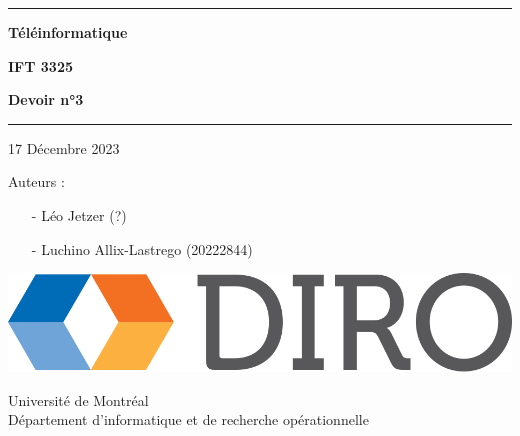 \documentclass{article}
\begin{document}
\begin{titlepage}

	\begin{center}
		\hrule

		\vspace{.5cm}

		\Huge
		\textbf{Téléinformatique}

		\vspace{.3cm}
		\LARGE

		\textbf{IFT 3325}
		\vspace{.3cm}

		\textbf{Devoir n°3}
		\vspace{.3cm}

		\hrule

		\vspace{1cm}

		17 Décembre 2023 \\
	\end{center}

	\vspace{2cm}

	\LARGE

	\noindent Auteurs :

	\begin{enumerate}
		\item[-] Léo Jetzer (?)
		\item[-] Luchino Allix-Lastrego (20222844)   
	\end{enumerate}


			
	\vfill


	\begin{center}

		\includegraphics[scale=.1]{diro.png}

		\vspace{0.8cm}

		Université de Montréal\\
		Département d'informatique et de recherche opérationnelle\\

	\end{center}
	
\end{titlepage}
\end{document}
